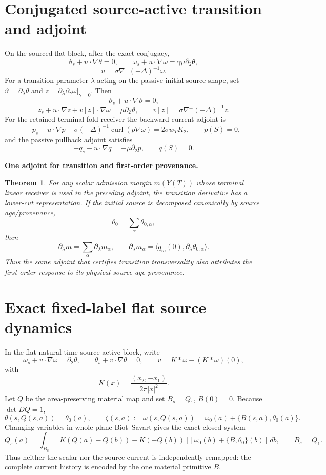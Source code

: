 \documentclass[11pt]{article}
\newtheorem{theorem}{Theorem}[section]\newtheorem{proposition}[theorem]{Proposition}
\theoremstyle{definition}\newtheorem{definition}[theorem]{Definition}\newtheorem{problem}[theorem]{Problem}
\theoremstyle{remark}\newtheorem{remark}[theorem]{Remark}
\begin{document}
\section{Conjugated source-active transition and adjoint}
On the sourced flat block, after the exact conjugacy,
\[
\theta_s+u\cdot\nabla\theta=0,
\qquad
\omega_s+u\cdot\nabla\omega=\gamma\mu\partial_2\theta,
\]
\[
u=\sigma\nabla^\perp(-\Delta)^{-1}\omega.
\]
For a transition parameter $\lambda$ acting on the passive initial source
shape, set $\vartheta=\partial_\lambda\theta$ and
$z=\partial_\lambda\partial_\gamma\omega|_{\gamma=0}$.  Then
\[
\vartheta_s+u\cdot\nabla\vartheta=0,
\]
\[
z_s+u\cdot\nabla z+v[z]\cdot\nabla\omega
=\mu\partial_2\vartheta,
\qquad v[z]=\sigma\nabla^\perp(-\Delta)^{-1}z.
\]
For the retained terminal fold receiver the backward current adjoint is
\[
-p_s-u\cdot\nabla p
-\sigma(-\Delta)^{-1}\operatorname{curl}(p\nabla\omega)
=2\sigma w_TK_2,
\qquad p(S)=0,
\]
and the passive pullback adjoint satisfies
\[
-q_s-u\cdot\nabla q=-\mu\partial_2p,
\qquad q(S)=0.
\]

\medskip
\noindent\textbf{One adjoint for transition and first-order provenance.}
\begin{theorem}
For any scalar admission margin $m(Y(T))$ whose terminal linear receiver is
used in the preceding adjoint, the transition derivative has a lower-cut
representation.  If the initial source is decomposed canonically by source
age/provenance,
\[
\theta_0=\sum_\alpha\theta_{0,\alpha},
\]
then
\[
\boxed{\partial_\lambda m=\sum_\alpha\partial_\lambda m_\alpha},
\qquad
\boxed{\partial_\lambda m_\alpha
=\langle q_m(0),\partial_\lambda\theta_{0,\alpha}\rangle}.
\]
Thus the same adjoint that certifies transition transversality also attributes
the first-order response to its physical source-age provenance.
\end{theorem}

\section{Exact fixed-label flat source dynamics}
\label{sec:fixed-label}

In the flat natural-time source-active block, write
\[
 \omega_s+v\cdot\nabla\omega=\partial_2\theta,
 \qquad
 \theta_s+v\cdot\nabla\theta=0,
 \qquad
 v=K*\omega-(K*\omega)(0),
\]
with
\[
 K(x)=\frac{(x_2,-x_1)}{2\pi|x|^2}.
\]
Let $Q$ be the area-preserving material map and set $B_s=Q_1$, $B(0)=0$.
Because $\det DQ=1$,
\[
 \boxed{
 \theta(s,Q(s,a))=\theta_0(a),\qquad
 \zeta(s,a):=\omega(s,Q(s,a))
 =\omega_0(a)+\{B(s,a),\theta_0(a)\}.
 }
\]
Changing variables in whole-plane Biot--Savart gives the exact closed system
\[
\boxed{
 Q_s(a)=\int_{B_8}
 [K(Q(a)-Q(b))-K(-Q(b))]
 [\omega_0(b)+\{B,\theta_0\}(b)]\,db,
 \qquad B_s=Q_1.
}
\]
Thus neither the scalar nor the source current is independently remapped: the
complete current history is encoded by the one material primitive $B$.
\end{document}
